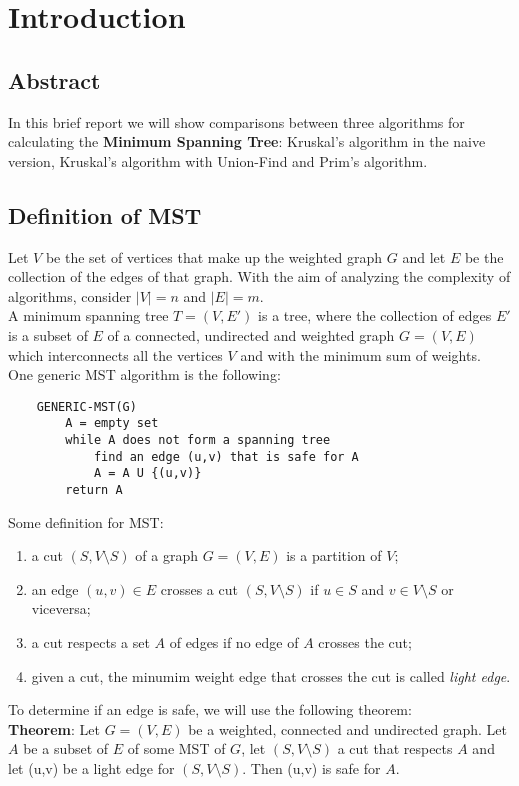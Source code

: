 \section{Introduction}

\subsection*{Abstract}
In this brief report we will show comparisons between three algorithms for calculating the \textbf{Minimum Spanning Tree}: Kruskal's algorithm in the naive version, Kruskal's algorithm with Union-Find and Prim's algorithm.

\subsection*{Definition of MST}
Let $V$ be the set of vertices that make up the weighted graph $G$ and let $E$ be the collection of the edges of that graph. With the aim of analyzing the complexity of algorithms, consider $|V| = n$ and $|E| = m$. \\
A minimum spanning tree $T = (V,E')$ is a tree, where the collection of edges $E'$ is a subset of $E$ of a connected, undirected and weighted graph $G = (V,E)$ which interconnects all the vertices $V$ and with the minimum sum of weights. \\
\noindent
One generic MST algorithm is the following: 
\begin{verbatim}
    GENERIC-MST(G)
        A = empty set
        while A does not form a spanning tree
            find an edge (u,v) that is safe for A
            A = A U {(u,v)}
        return A
\end{verbatim}
\noindent
Some definition for MST:
\begin{enumerate}
    \item a cut $(S, V \setminus S)$ of a graph $G = (V, E)$ is a partition of $V$;
    \item an edge $(u,v) \in E$ crosses a cut $(S, V \setminus S)$ if $u\in S$ and $v \in V \setminus S$ or viceversa;
    \item a cut respects a set $A$ of edges if no edge of $A$ crosses the cut;
    \item given a cut, the minumim weight edge that crosses the cut is called \textit{light edge}.
\end{enumerate}
\noindent
To determine if an edge is safe, we will use the following theorem: \\ \noindent
\textbf{Theorem}: Let $G = (V,E)$ be a weighted, connected and undirected graph. Let $A$ be a subset of $E$ of some MST of $G$, let $(S, V \setminus S)$ a cut that respects $A$ and let (u,v) be a light edge for $(S, V \setminus S)$. Then (u,v) is safe for $A$.
